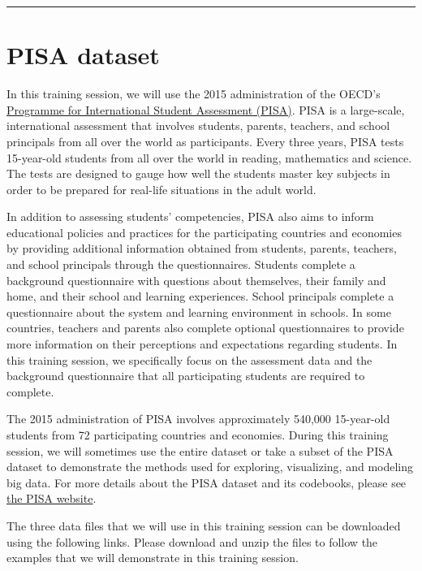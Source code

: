 \documentclass[]{book}
\begin{document}
\begin{center}\rule{0.5\linewidth}{\linethickness}\end{center}

\hypertarget{pisa-dataset}{%
\section{PISA dataset}\label{pisa-dataset}}

In this training session, we will use the 2015 administration of the OECD's \href{http://www.oecd.org/pisa/}{Programme for International Student Assessment (PISA)}. PISA is a large-scale, international assessment that involves students, parents, teachers, and school principals from all over the world as participants. Every three years, PISA tests 15-year-old students from all over the world in reading, mathematics and science. The tests are designed to gauge how well the students master key subjects in order to be prepared for real-life situations in the adult world.

In addition to assessing students' competencies, PISA also aims to inform educational policies and practices for the participating countries and economies by providing additional information obtained from students, parents, teachers, and school principals through the questionnaires. Students complete a background questionnaire with questions about themselves, their family and home, and their school and learning experiences. School principals complete a questionnaire about the system and learning environment in schools. In some countries, teachers and parents also complete optional questionnaires to provide more information on their perceptions and expectations regarding students. In this training session, we specifically focus on the assessment data and the background questionnaire that all participating students are required to complete.

The 2015 administration of PISA involves approximately 540,000 15-year-old students from 72 participating countries and economies. During this training session, we will sometimes use the entire dataset or take a subset of the PISA dataset to demonstrate the methods used for exploring, visualizing, and modeling big data. For more details about the PISA dataset and its codebooks, please see \href{http://www.oecd.org/pisa/data/2015database/}{the PISA website}.

The three data files that we will use in this training session can be downloaded using the following links. Please download and unzip the files to follow the examples that we will demonstrate in this training session.
\end{document}
